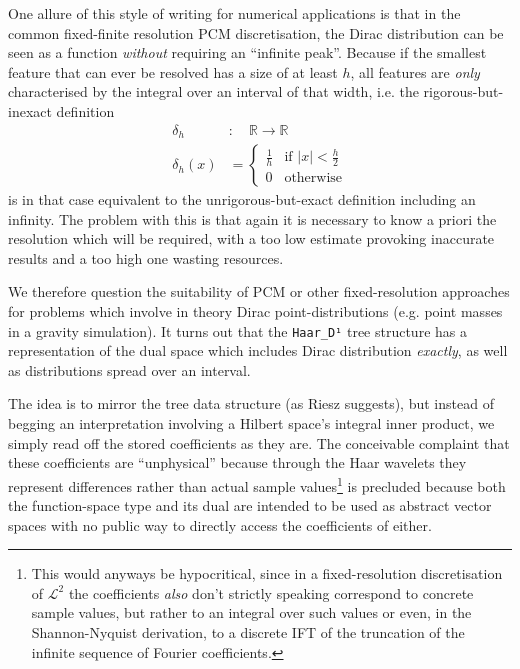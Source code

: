 \documentclass[sigplan,review,anonymous]{acmart}\settopmatter{printfolios=true,printccs=false,printacmref=false}
\begin{document}
One allure of this style of writing for numerical applications is that in the common fixed-finite resolution PCM discretisation, the Dirac distribution can be seen as a function \emph{without} requiring an “infinite peak”. Because if the smallest feature that can ever be resolved has a size of at least $h$, all features are \emph{only} characterised by the integral over an interval of that width, i.e. the rigorous-but-inexact definition
\begin{align*}
  \delta_h &:\quad \mathbb{R} \to \mathbb{R}
 \\
  \delta_h(x) &= \begin{cases} \frac1h & \text{if }|x|<\tfrac{h}2
                          \\ 0         & \text{otherwise} \end{cases}
\end{align*}
is in that case equivalent to the unrigorous-but-exact definition including an infinity. The problem with this is that again it is necessary to know a priori the resolution which will be required, with a too low estimate provoking inaccurate results and a too high one wasting resources.

We therefore question the suitability of PCM or other fixed-resolution approaches for problems which involve in theory Dirac point-distributions (e.g. point masses in a gravity simulation). It turns out that the \lstinline`Haar_D¹` tree structure has a representation of the dual space which includes Dirac distribution \emph{exactly}, as well as distributions spread over an interval.

The idea is to mirror the tree data structure (as Riesz suggests), but instead of begging an interpretation involving a Hilbert space's integral inner product, we simply read off the stored coefficients as they are. The conceivable complaint that these coefficients are “unphysical” because through the Haar wavelets they represent differences rather than actual sample values\footnote{%
This would anyways be hypocritical, since in a fixed-resolution discretisation of $\mathcal{L}^2$ the coefficients \emph{also} don't strictly speaking correspond to concrete sample values, but rather to an integral over such values or even, in the Shannon-Nyquist derivation, to a discrete IFT of the truncation of the infinite sequence of Fourier coefficients.
} is precluded because both the function-space type and its dual are intended to be used as abstract vector spaces with no public way to directly access the coefficients of either.
\end{document}

